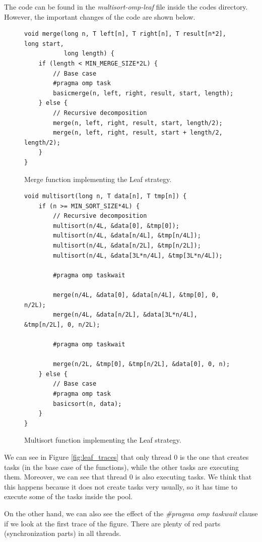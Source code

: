 \documentclass[12pt, a4paper]{article}
\begin{document}
The code can be found in the \textit{multisort-omp-leaf} file inside the codes directory. However, the important changes of the code are shown below.

\begin{figure}[H]
\begin{lstlisting}
void merge(long n, T left[n], T right[n], T result[n*2], long start,
		   long length) {
    if (length < MIN_MERGE_SIZE*2L) {
        // Base case
        #pragma omp task
        basicmerge(n, left, right, result, start, length);
    } else {
        // Recursive decomposition
        merge(n, left, right, result, start, length/2);
        merge(n, left, right, result, start + length/2, length/2);
    }
}
\end{lstlisting}

\caption{Merge function implementing the Leaf strategy.}
\end{figure}

\begin{figure}[H]
\begin{lstlisting}
void multisort(long n, T data[n], T tmp[n]) {
    if (n >= MIN_SORT_SIZE*4L) {
        // Recursive decomposition
		multisort(n/4L, &data[0], &tmp[0]);
		multisort(n/4L, &data[n/4L], &tmp[n/4L]);
		multisort(n/4L, &data[n/2L], &tmp[n/2L]);
		multisort(n/4L, &data[3L*n/4L], &tmp[3L*n/4L]);
		
		#pragma omp taskwait
		
		merge(n/4L, &data[0], &data[n/4L], &tmp[0], 0, n/2L);
		merge(n/4L, &data[n/2L], &data[3L*n/4L], &tmp[n/2L], 0, n/2L);
		
		#pragma omp taskwait
		
        merge(n/2L, &tmp[0], &tmp[n/2L], &data[0], 0, n);
	} else {
		// Base case
		#pragma omp task
		basicsort(n, data);
	}
}
\end{lstlisting}

\caption{Multisort function implementing the Leaf strategy.}
\end{figure}

We can see in Figure \ref{fig:leaf_traces} that only thread 0 is the one that creates tasks (in the base case of the functions), while the other tasks are executing them. Moreover, we can see that thread 0 is also executing tasks. We think that this happens because it does not create tasks very usually, so it has time to execute some of the tasks inside the pool.

On the other hand, we can also see the effect of the \textit{\#pragma omp taskwait} clause if we look at the first trace of the figure. There are plenty of red parts (synchronization parts) in all threads.
\end{document}
